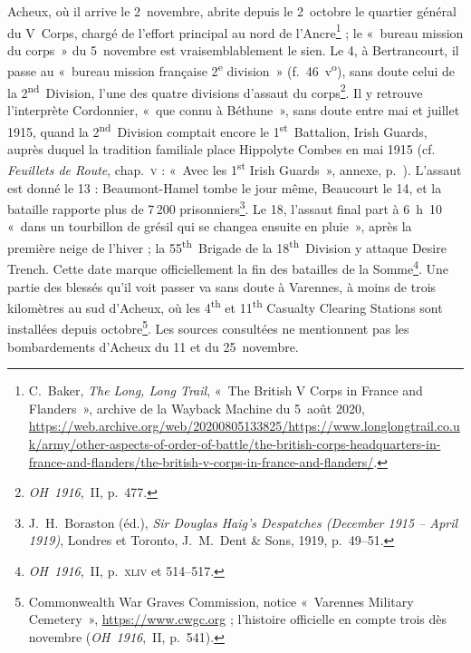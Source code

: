 Acheux, où il arrive le 2~novembre, abrite depuis le 2~octobre le quartier général du V~Corps, chargé de l'effort principal au nord de l'Ancre\footnote{C.~Baker, \textit{The Long, Long Trail}, «~The British V Corps in France and Flanders~», archive de la Wayback Machine du 5~août 2020, \url{https://web.archive.org/web/20200805133825/https://www.longlongtrail.co.uk/army/other-aspects-of-order-of-battle/the-british-corps-headquarters-in-france-and-flanders/the-british-v-corps-in-france-and-flanders/}.} ; le «~bureau mission du corps~» du 5~novembre est vraisemblablement le sien. Le 4, à Bertrancourt, il passe au «~bureau mission française 2\textsuperscript{e} division~» (f.~46~v\textsuperscript{o}), sans doute celui de la 2\textsuperscript{nd}~Division, l'une des quatre divisions d'assaut du corps\footnote{\textit{OH~1916},~II, p.~477.}. Il y retrouve l'interprète Cordonnier, «~que connu à Béthune~», sans doute entre mai et juillet 1915, quand la 2\textsuperscript{nd}~Division comptait encore le 1\textsuperscript{st}~Battalion, Irish Guards, auprès duquel la tradition familiale place Hippolyte Combes en mai 1915 (cf. \textit{Feuillets de Route}, chap.~\textsc{v} : «~Avec les 1\textsuperscript{st} Irish Guards~», annexe, p.~\pageref{annexe:doc6-v}). L'assaut est donné le 13 : Beaumont-Hamel tombe le jour même, Beaucourt le 14, et la bataille rapporte plus de 7\,200 prisonniers\footnote{J.~H.~Boraston (éd.), \textit{Sir Douglas Haig's Despatches (December 1915 -- April 1919)}, Londres et Toronto, J.~M.~Dent \& Sons, 1919, p.~49--51.}. Le 18, l'assaut final part à 6~h~10 «~dans un tourbillon de grésil qui se changea ensuite en pluie~», après la première neige de l'hiver ; la 55\textsuperscript{th}~Brigade de la 18\textsuperscript{th}~Division y attaque Desire Trench. Cette date marque officiellement la fin des batailles de la Somme\footnote{\textit{OH~1916},~II, p.~\textsc{xliv} et 514--517.}. Une partie des blessés qu'il voit passer va sans doute à Varennes, à moins de trois kilomètres au sud d'Acheux, où les 4\textsuperscript{th} et 11\textsuperscript{th} Casualty Clearing Stations sont installées depuis octobre\footnote{Commonwealth War Graves Commission, notice «~Varennes Military Cemetery~», \url{https://www.cwgc.org} ; l'histoire officielle en compte trois dès novembre (\textit{OH~1916},~II, p.~541).}. Les sources consultées ne mentionnent pas les bombardements d'Acheux du 11 et du 25~novembre.

